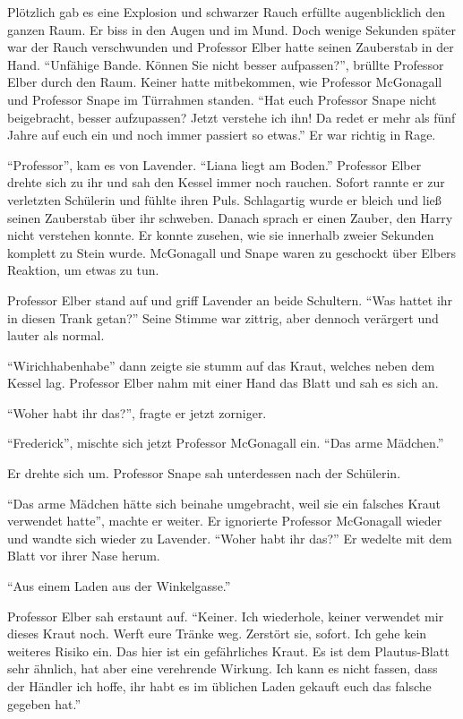 Plötzlich gab es eine Explosion und schwarzer Rauch erfüllte augenblicklich den ganzen Raum. Er biss in den Augen und im Mund. Doch wenige Sekunden später war der Rauch verschwunden und Professor Elber hatte seinen Zauberstab in der Hand. \enquote{Unfähige Bande. Können Sie nicht besser aufpassen?}, brüllte Professor Elber durch den Raum. Keiner hatte mitbekommen, wie Professor McGonagall und Professor Snape im Türrahmen standen. \enquote{Hat euch Professor Snape nicht beigebracht, besser aufzupassen? Jetzt verstehe ich ihn! Da redet er mehr als fünf Jahre auf euch ein und noch immer passiert so etwas.} Er war richtig in Rage.

\enquote{Professor}, kam es von Lavender. \enquote{Liana liegt am Boden.} Professor Elber drehte sich zu ihr und sah den Kessel immer noch rauchen. Sofort rannte er zur verletzten Schülerin und fühlte ihren Puls. Schlagartig wurde er bleich und ließ seinen Zauberstab über ihr schweben. Danach sprach er einen Zauber, den Harry nicht verstehen konnte. Er konnte zusehen, wie sie innerhalb zweier Sekunden komplett zu Stein wurde. McGonagall und Snape waren zu geschockt über Elbers Reaktion, um etwas zu tun.

Professor Elber stand auf und griff Lavender an beide Schultern. \enquote{Was hattet ihr in diesen Trank getan?} Seine Stimme war zittrig, aber dennoch verärgert und lauter als normal.

\enquote{Wir\abs ich\abs haben\abs habe\abs} dann zeigte sie stumm auf das Kraut, welches neben dem Kessel lag. Professor Elber nahm mit einer Hand das Blatt und sah es sich an.

\enquote{Woher habt ihr das?}, fragte er jetzt zorniger.

\enquote{Frederick}, mischte sich jetzt Professor McGonagall ein. \enquote{Das arme Mädchen.}

Er drehte sich um. Professor Snape sah unterdessen nach der Schülerin.

\enquote{Das arme Mädchen hätte sich beinahe umgebracht, weil sie ein falsches Kraut verwendet hatte}, machte er weiter. Er ignorierte Professor McGonagall wieder und wandte sich wieder zu Lavender. \enquote{Woher habt ihr das?} Er wedelte mit dem Blatt vor ihrer Nase herum.

\enquote{Aus einem Laden aus der Winkelgasse.}

Professor Elber sah erstaunt auf. \enquote{Keiner. Ich wiederhole, keiner verwendet mir dieses Kraut noch. Werft eure Tränke weg. Zerstört sie, sofort. Ich gehe kein weiteres Risiko ein. Das hier ist ein gefährliches Kraut. Es ist dem Plautus-Blatt sehr ähnlich, hat aber eine verehrende Wirkung. Ich kann es nicht fassen, dass der Händler \gst ich hoffe, ihr habt es im üblichen Laden gekauft \gst euch das falsche gegeben hat.}

